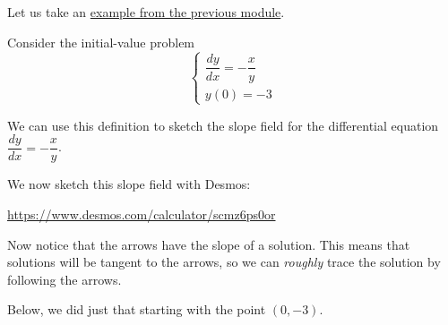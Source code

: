 \begin{example}
Let us take an \hyperlink{sols-ex}{example from the previous module}.

Consider the initial-value problem
$$
\begin{cases}
	\dfrac{dy}{dx}=-\dfrac{x}{y} \\
	y(0)=-3
\end{cases}
$$

We can use this definition to sketch the slope field for the differential equation $ \dfrac{dy}{dx} = -\dfrac{x}{y}$.

We now sketch this slope field with Desmos:

\url{https://www.desmos.com/calculator/scmz6ps0or} \hfill {}

Now notice that the arrows have the slope of a solution. This means that solutions will be tangent to the arrows, so we can \emph{roughly} trace the solution by following the arrows.

Below, we did just that starting with the point $(0,-3)$.


\end{example}
